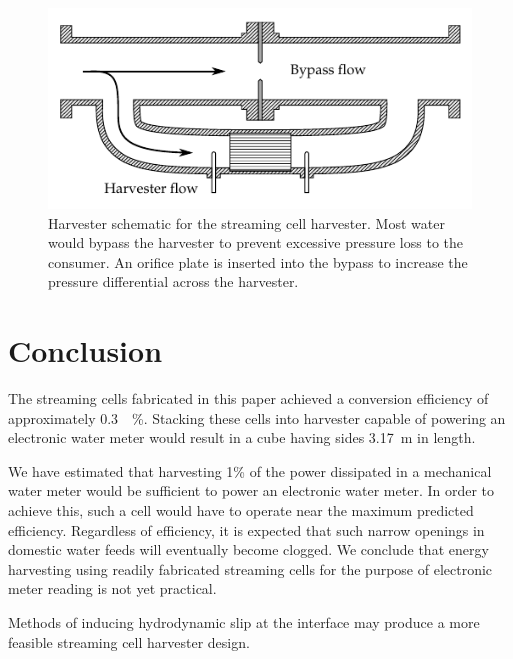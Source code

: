 \documentclass[10pt,final,journal]{IEEEtran}
\begin{document}
        \begin{figure}
            \begin{center}
            \includegraphics[]{harvester3}
            \end{center}
            \caption{Harvester schematic for the streaming cell harvester.
            Most water would bypass the harvester to prevent excessive pressure loss to the consumer.
            An orifice plate is inserted into the bypass to increase the pressure differential across the harvester.}
            \label{fig:harvester}
        \end{figure}

    \section{Conclusion}
        \label{sect:conclusion}
        The streaming cells fabricated in this paper achieved a conversion efficiency of approximately \SI{0.3}{\micro\%}.
        Stacking these cells into harvester capable of powering an electronic water meter would result in a cube having sides \SI{3.17}{\meter} in length.

        We have estimated that harvesting 1\% of the power dissipated in a mechanical water meter would be sufficient to power an electronic water meter.
        In order to achieve this, such a cell would have to operate near the maximum predicted efficiency.
        Regardless of efficiency, it is expected that such narrow openings in domestic water feeds will eventually become clogged.
        We conclude that energy harvesting using readily fabricated streaming cells for the purpose of electronic meter reading is not yet practical.

        Methods of inducing hydrodynamic slip at the interface may produce a more feasible streaming cell harvester design.

    
    
\end{document}
